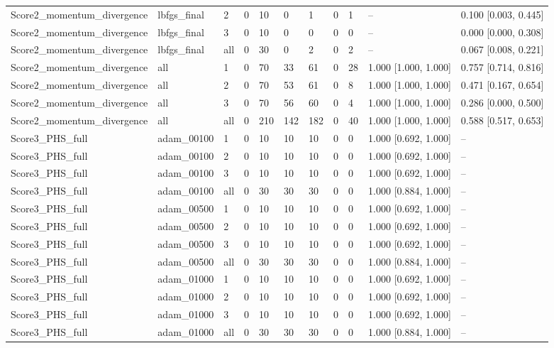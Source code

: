 \begin{longtable}{lllllllllll}
Score2\_momentum\_divergence & lbfgs\_final & 2 & 0 & 10 & 0 & 1 & 0 & 1 & -- & 0.100 [0.003, 0.445] \\
Score2\_momentum\_divergence & lbfgs\_final & 3 & 0 & 10 & 0 & 0 & 0 & 0 & -- & 0.000 [0.000, 0.308] \\
Score2\_momentum\_divergence & lbfgs\_final & all & 0 & 30 & 0 & 2 & 0 & 2 & -- & 0.067 [0.008, 0.221] \\
Score2\_momentum\_divergence & all & 1 & 0 & 70 & 33 & 61 & 0 & 28 & 1.000 [1.000, 1.000] & 0.757 [0.714, 0.816] \\
Score2\_momentum\_divergence & all & 2 & 0 & 70 & 53 & 61 & 0 & 8 & 1.000 [1.000, 1.000] & 0.471 [0.167, 0.654] \\
Score2\_momentum\_divergence & all & 3 & 0 & 70 & 56 & 60 & 0 & 4 & 1.000 [1.000, 1.000] & 0.286 [0.000, 0.500] \\
Score2\_momentum\_divergence & all & all & 0 & 210 & 142 & 182 & 0 & 40 & 1.000 [1.000, 1.000] & 0.588 [0.517, 0.653] \\
Score3\_PHS\_full & adam\_00100 & 1 & 0 & 10 & 10 & 10 & 0 & 0 & 1.000 [0.692, 1.000] & -- \\
Score3\_PHS\_full & adam\_00100 & 2 & 0 & 10 & 10 & 10 & 0 & 0 & 1.000 [0.692, 1.000] & -- \\
Score3\_PHS\_full & adam\_00100 & 3 & 0 & 10 & 10 & 10 & 0 & 0 & 1.000 [0.692, 1.000] & -- \\
Score3\_PHS\_full & adam\_00100 & all & 0 & 30 & 30 & 30 & 0 & 0 & 1.000 [0.884, 1.000] & -- \\
Score3\_PHS\_full & adam\_00500 & 1 & 0 & 10 & 10 & 10 & 0 & 0 & 1.000 [0.692, 1.000] & -- \\
Score3\_PHS\_full & adam\_00500 & 2 & 0 & 10 & 10 & 10 & 0 & 0 & 1.000 [0.692, 1.000] & -- \\
Score3\_PHS\_full & adam\_00500 & 3 & 0 & 10 & 10 & 10 & 0 & 0 & 1.000 [0.692, 1.000] & -- \\
Score3\_PHS\_full & adam\_00500 & all & 0 & 30 & 30 & 30 & 0 & 0 & 1.000 [0.884, 1.000] & -- \\
Score3\_PHS\_full & adam\_01000 & 1 & 0 & 10 & 10 & 10 & 0 & 0 & 1.000 [0.692, 1.000] & -- \\
Score3\_PHS\_full & adam\_01000 & 2 & 0 & 10 & 10 & 10 & 0 & 0 & 1.000 [0.692, 1.000] & -- \\
Score3\_PHS\_full & adam\_01000 & 3 & 0 & 10 & 10 & 10 & 0 & 0 & 1.000 [0.692, 1.000] & -- \\
Score3\_PHS\_full & adam\_01000 & all & 0 & 30 & 30 & 30 & 0 & 0 & 1.000 [0.884, 1.000] & -- \\

\end{longtable}
